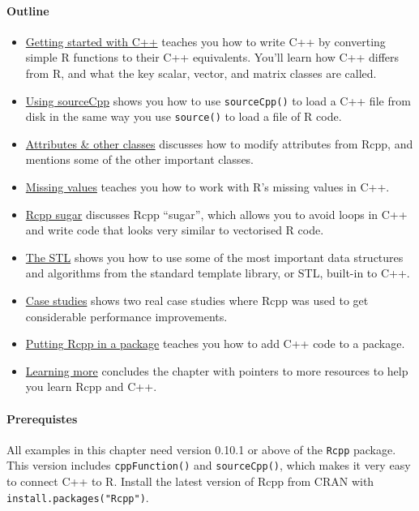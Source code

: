 \hypertarget{outline}{%
\paragraph{Outline}\label{outline}}

\begin{itemize}
\item
  \protect\hyperlink{rcpp-intro}{Getting started with C++} teaches you
  how to write C++ by converting simple R functions to their C++
  equivalents. You'll learn how C++ differs from R, and what the key
  scalar, vector, and matrix classes are called.
\item
  \protect\hyperlink{sourceCpp}{Using sourceCpp} shows you how to use
  \texttt{sourceCpp()} to load a C++ file from disk in the same way you
  use \texttt{source()} to load a file of R code.
\item
  \protect\hyperlink{rcpp-classes}{Attributes \& other classes}
  discusses how to modify attributes from Rcpp, and mentions some of the
  other important classes.
\item
  \protect\hyperlink{rcpp-na}{Missing values} teaches you how to work
  with R's missing values in C++.
\item
  \protect\hyperlink{rcpp-sugar}{Rcpp sugar} discusses Rcpp ``sugar'',
  which allows you to avoid loops in C++ and write code that looks very
  similar to vectorised R code.
\item
  \protect\hyperlink{stl}{The STL} shows you how to use some of the most
  important data structures and algorithms from the standard template
  library, or STL, built-in to C++.
\item
  \protect\hyperlink{rcpp-case-studies}{Case studies} shows two real
  case studies where Rcpp was used to get considerable performance
  improvements.
\item
  \protect\hyperlink{rcpp-package}{Putting Rcpp in a package} teaches
  you how to add C++ code to a package.
\item
  \protect\hyperlink{rcpp-more}{Learning more} concludes the chapter
  with pointers to more resources to help you learn Rcpp and C++.
\end{itemize}

\hypertarget{prerequistes}{%
\paragraph{Prerequistes}\label{prerequistes}}

All examples in this chapter need version 0.10.1 or above of the
\texttt{Rcpp} package. This version includes \texttt{cppFunction()} and
\texttt{sourceCpp()}, which makes it very easy to connect C++ to R.
Install the latest version of Rcpp from CRAN with
\texttt{install.packages("Rcpp")}.

